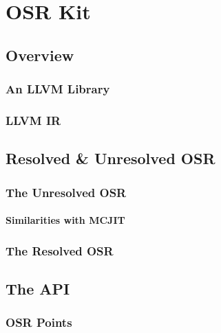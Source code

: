 
\chapter{OSR Kit} %

\label{Chapter4} %


\newcommand{\keyword}[1]{\textbf{#1}}
\newcommand{\tabhead}[1]{\textbf{#1}}
\newcommand{\code}[1]{\texttt{#1}}
\newcommand{\file}[1]{\texttt{\bfseries#1}}
\newcommand{\option}[1]{\texttt{\itshape#1}}

\section{Overview}
\subsection{An LLVM Library}
\subsection{LLVM IR}

\section{Resolved \& Unresolved OSR}
\subsection{The Unresolved OSR}
\subsubsection{Similarities with MCJIT}
\subsection{The Resolved OSR}

\section{The API}
\subsection{OSR Points}
